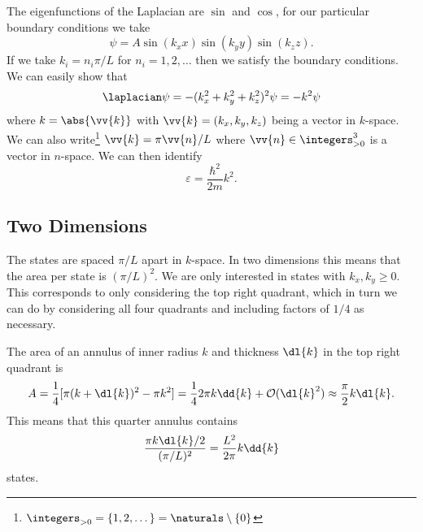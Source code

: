 \documentclass[fleqn]{NotesClass}
\newcommand*{\order}{\mathcal{O}}
\begin{document}
    The eigenfunctions of the Laplacian are \(\sin\) and \(\cos\), for our particular boundary conditions we take
    \begin{equation}
        \psi = A\sin(k_x x) \sin(k_y y) \sin(k_z z).
    \end{equation}
    If we take \(k_i = n_i\pi/L\) for \(n_i = 1, 2, \dotsc\) then we satisfy the boundary conditions.
    We can easily show that
    \begin{equation}
        \laplacian\psi = -(k_x^2 + k_y^2 + k_z^2)^2\psi = -k^2\psi
    \end{equation}
    where \(k = \abs{\vv{k}}\) with \(\vv{k} = (k_x, k_y, k_z)\) being a vector in \(k\)-space.
    We can also write\footnote{\(\integers_{>0} = \{1, 2, \dotsc\} = \naturals\setminus\{0\}\)} \(\vv{k} = \pi\vv{n}/L\) where \(\vv{n} \in \integers_{>0}^3\) is a vector in \(n\)-space.
    We can then identify
    \begin{equation}
        \varepsilon = \frac{\hbar^2}{2m}k^2.
    \end{equation}
    
    \subsection{Two Dimensions}
    The states are spaced \(\pi/L\) apart in \(k\)-space.
    In two dimensions this means that the area per state is \((\pi/L)^2\).
    We are only interested in states with \(k_x, k_y \ge 0\).
    This corresponds to only considering the top right quadrant, which in turn we can do by considering all four quadrants and including factors of \(1/4\) as necessary.
    
    The area of an annulus of inner radius \(k\) and thickness \(\dl{k}\) in the top right quadrant is
    \begin{equation}
        A = \frac{1}{4} [\pi (k + \dl{k})^2 - \pi k^2] = \frac{1}{4}2\pi k\dd{k} + \order(\dl{k}^2) \approx \frac{\pi}{2}k\dl{k}.
    \end{equation}
    This means that this quarter annulus contains
    \begin{equation}
        \frac{\pi k \dl{k}/2}{(\pi/L)^2} = \frac{L^2}{2\pi} k\dd{k}
    \end{equation}
    states.
    
\end{document}

